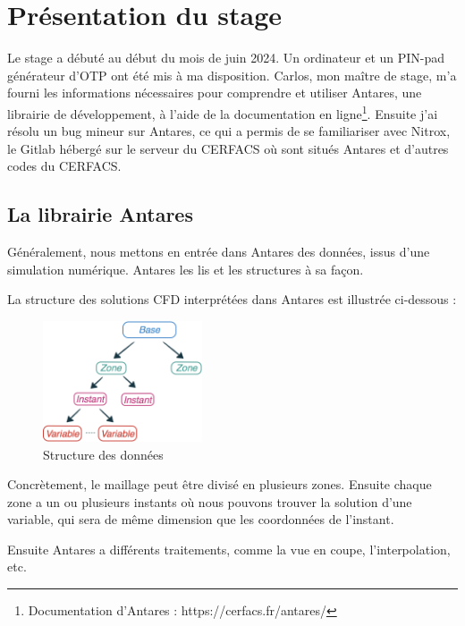 \chapter{Présentation du stage}

Le stage a débuté au début du mois de juin 2024. Un ordinateur et un PIN-pad générateur d'\ac{OTP} ont été mis à ma disposition. Carlos, mon maître de stage, m'a fourni les informations nécessaires pour comprendre et utiliser Antares\cite{antares}, une librairie de développement, à l'aide de la documentation en ligne\footnote{Documentation d'Antares : https://cerfacs.fr/antares/}. Ensuite j'ai résolu un bug mineur sur Antares, ce qui a permis de se familiariser avec Nitrox, le Gitlab hébergé sur le serveur du CERFACS où sont situés Antares et d'autres codes du CERFACS.


\section{La librairie Antares}

Généralement, nous mettons en entrée dans Antares des données, issus d'une simulation numérique. Antares les lis et les structures à sa façon.

La structure des solutions CFD interprétées dans Antares est illustrée ci-dessous :

\begin{figure}[ht!]
\centering
\includegraphics[width=0.42\textwidth]{images/data_structure_1.png}
\caption{Structure des données}
\end{figure}

Concrètement, le maillage peut être divisé en plusieurs zones.
Ensuite chaque zone a un ou plusieurs instants où nous pouvons trouver la solution d'une variable, qui sera de même dimension que les coordonnées de l'instant.

Ensuite Antares a différents traitements, comme la vue en coupe, l'interpolation, etc.

